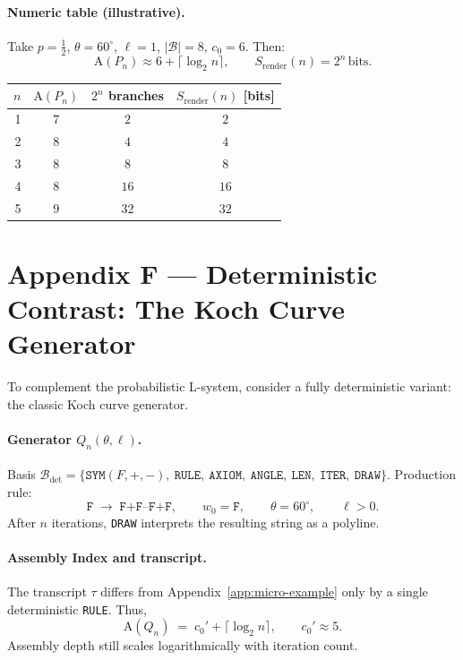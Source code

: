\documentclass[12pt,a4paper]{article}
\theoremstyle{plain}
\theoremstyle{definition}
\theoremstyle{remark}
\newcommand{\Sfield}{S}
\newcommand{\AI}{\mathrm{A}}
\begin{document}
\paragraph{Numeric table (illustrative).}
Take $p=\tfrac{1}{2}$, $\theta=60^\circ$, $\ell=1$, $|\mathcal{B}|=8$, $c_0=6$. Then:
\[
\AI(P_n) \approx 6 + \lceil \log_2 n \rceil, \qquad
\Sfield_{\text{render}}(n) = 2^n \,\text{bits}.
\]
\begin{center}
\renewcommand{\arraystretch}{1.2}
\begin{tabular}{@{}rccc@{}}
\toprule
$n$ & $\AI(P_n)$ & $2^n$ branches & $\Sfield_{\text{render}}(n)$ [bits] \\
\midrule
1 & $7$ & $2$ & $2$ \\
2 & $8$ & $4$ & $4$ \\
3 & $8$ & $8$ & $8$ \\
4 & $8$ & $16$ & $16$ \\
5 & $9$ & $32$ & $32$ \\
\bottomrule
\end{tabular}
\end{center}

\section{Appendix F — Deterministic Contrast: The Koch Curve Generator}
\label{app:koch-example}

To complement the probabilistic L-system, consider a fully deterministic variant: the classic Koch curve generator.

\paragraph{Generator $Q_n(\theta,\ell)$.}
Basis $\mathcal{B}_\mathrm{det}=\{\texttt{SYM}(F,+,-),~\texttt{RULE},~\texttt{AXIOM},~\texttt{ANGLE},~\texttt{LEN},~\texttt{ITER},~\texttt{DRAW}\}$. Production rule:
\[
\texttt{F}\;\to\;\texttt{F+F--F+F}, \qquad w_0=\texttt{F}, \qquad \theta=60^\circ, \qquad \ell>0.
\]
After $n$ iterations, \texttt{DRAW} interprets the resulting string as a polyline.

\paragraph{Assembly Index and transcript.}
The transcript $\tau$ differs from Appendix~\ref{app:micro-example} only by a single deterministic \texttt{RULE}. Thus,
\[
\AI(Q_n) \;=\; c_0' + \Big\lceil \log_2 n \Big\rceil, \qquad c_0'\approx 5.
\]
Assembly depth still scales logarithmically with iteration count.
\end{document}
